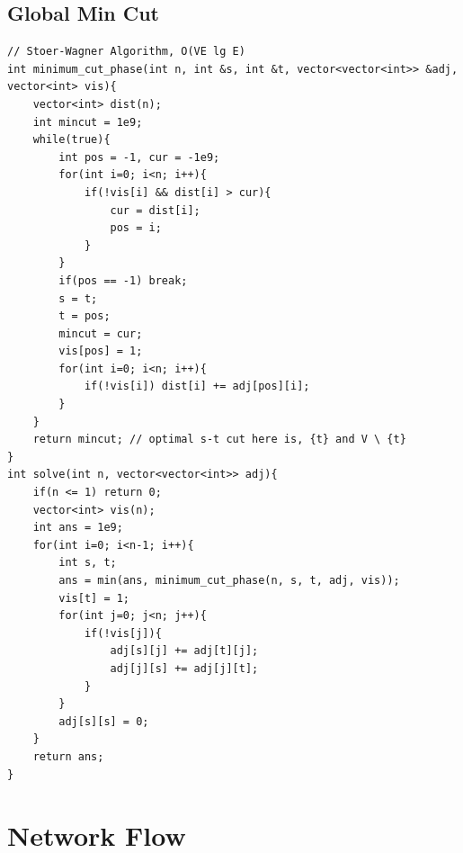 \documentclass[landscape, 8pt, a4paper, oneside, twocolumn]{extarticle}
\begin{document}
\subsection{Global Min Cut}
\begin{verbatim}
// Stoer-Wagner Algorithm, O(VE lg E)
int minimum_cut_phase(int n, int &s, int &t, vector<vector<int>> &adj, vector<int> vis){
    vector<int> dist(n);
    int mincut = 1e9;
    while(true){
        int pos = -1, cur = -1e9;
        for(int i=0; i<n; i++){
            if(!vis[i] && dist[i] > cur){
                cur = dist[i];
                pos = i;
            }
        }
        if(pos == -1) break;
        s = t;
        t = pos;
        mincut = cur;
        vis[pos] = 1;
        for(int i=0; i<n; i++){
            if(!vis[i]) dist[i] += adj[pos][i];
        }
    }
    return mincut; // optimal s-t cut here is, {t} and V \ {t}
}
int solve(int n, vector<vector<int>> adj){
    if(n <= 1) return 0;
    vector<int> vis(n);
    int ans = 1e9;
    for(int i=0; i<n-1; i++){
        int s, t;
        ans = min(ans, minimum_cut_phase(n, s, t, adj, vis));
        vis[t] = 1;
        for(int j=0; j<n; j++){
            if(!vis[j]){
                adj[s][j] += adj[t][j];
                adj[j][s] += adj[j][t];
            }
        }
        adj[s][s] = 0;
    }
    return ans;
}
\end{verbatim}
\section{Network Flow}
\end{document}
